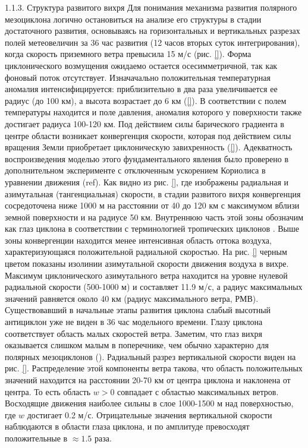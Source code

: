1.1.3.	Структура развитого вихря
Для понимания механизма развития полярного мезоциклона логично остановиться на анализе его структуры в стадии достаточного развития, основываясь на горизонтальных и вертикальных разрезах полей метеовеличин за 36 час развития (12 часов вторых суток интегрирования), когда скорость приземного ветра превысила 15 м/с (рис. \ref{}).
Форма циклонического возмущения ожидаемо остается осесимметричной, так как фоновый поток отсутствует. Изначачально положительная температурная аномалия интенсифицируется: приблизительно в два раза увеличивается ее радиус (до 100 км), а высота возрастает до 6 км (\ref{}). В соответствии с полем температуры находится и поле давления, аномалия которого у поверхности также достигает радиуса 100-120 км. 
Под действием силы барического градиента в центре области возникает конвергенция скорости, которая под действием силы вращения Земли приобретает циклоническую завихренность (\ref{}). Адекватность воспроизведения моделью этого фундаментального явления было проверено в дополнительном эксперименте с отключенным ускорением Кориолиса в уравнении движения (ref{}). Как видно из рис. \ref{}, где изображены радиальная и азимутальная (тангенциальная) скорости, в стадии развитого вихря конвергенция сосредоточена ниже 1000 м на расстоянии от 40 до 120 км с максимумом вблизи земной поверхности и на радиусе 50 км. Внутреннюю часть этой зоны обозначим как глаз циклона в соответствии с терминологией тропических циклонов \cite{Глебова_диссер}. Выше зоны конвергенции находится менее интенсивная область оттока воздуха, характеризующаяся положительной радиальной скоростью.
На рис. \ref{} черным цветом показаны изолинии азимутальной скорости движения воздуха в вихре. Максимум циклонического азимутального ветра находится на уровне нулевой радиальной скорости (500-1000 м) и составляет 11.9 м/с, а радиус максимальных значений равняется около 40 км (радиус максимального ветра, РМВ). Существовавший в начальные этапы развития циклона слабый высотный антициклон уже не виден в 36 час модельного времени. Глазу циклона соответствует область малых скоростей ветра. Заметим, что глаз вихря оказывается слишком малым в поперечнике, чем обычно характерно для полярных мезоциклонов (\cite{CraigGray1996}).
Радиальный разрез вертикальной скорости виден на рис. \ref{}. Распределение этой компоненты ветра такова, что область положительных значений находится на расстоянии 20-70 км от центра циклона и наклонена от центра. То есть область $w>0$ совпадает с областью максимальных ветров. Восходящие движения наиболее сильны в слое 1000-1500 м над поверхностью, где $w$ достигает 0.2 м/с. Отрицательные значения вертикальной скорости наблюдаются в области глаза циклона, и по амплитуде превосходят положительные в $\approx 1.5$ раза. 
